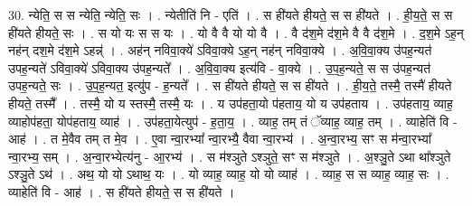 \documentclass[17pt]{extarticle}
\begin{document}
30. न्येति॒ स स न्येति॒ न्येति॒ सः । . न्येतीति॑ नि - एति॑ । . स ही॑यते हीयते॒ स स ही॑यते । . ही॒य॒ते॒ स स ही॑यते हीयते॒ सः । . स यो यः स स यः । . यो वै वै यो यो वै । . वै द॑श॒मे द॑श॒मे वै वै द॑श॒मे । . द॒श॒मे ऽह॒न् नह॑न् दश॒मे द॑श॒मे ऽहन्न्॑ । . अह॑न् नविवा॒क्ये॑ ऽविवा॒क्ये ऽह॒न् नह॑न् नविवा॒क्ये । . अ॒वि॒वा॒क्य उ॑पह॒न्यत॑ उपह॒न्यते॑ ऽविवा॒क्ये॑ ऽविवा॒क्य उ॑पह॒न्यते᳚ । . अ॒वि॒वा॒क्य इत्य॑वि - वा॒क्ये । . उ॒प॒ह॒न्यते॒ स स उ॑पह॒न्यत॑ उपह॒न्यते॒ सः । . उ॒प॒ह॒न्यत॒ इत्यु॑प - ह॒न्यते᳚ । . स ही॑यते हीयते॒ स स ही॑यते । . ही॒य॒ते॒ तस्मै॒ तस्मै॑ हीयते हीयते॒ तस्मै᳚ । . तस्मै॒ यो य स्तस्मै॒ तस्मै॒ यः । . य उप॑हता॒यो प॑हताय॒ यो य उप॑हताय । . उप॑हताय॒ व्याह॒ व्याहोप॑हता॒ योप॑हताय॒ व्याह॑ । . उप॑हता॒येत्युप॑ - ह॒ता॒य॒ । . व्याह॒ तम् तं ॅव्याह॒ व्याह॒ तम् । . व्याहेति॑ वि - आह॑ । . त मे॒वैव तम् त मे॒व । . ए॒वा न्वा॒रभ्या᳚ न्वा॒रभ्यै॒ वैवा न्वा॒रभ्य॑ । . अ॒न्वा॒रभ्य॒ सꣳ स म॑न्वा॒रभ्या᳚ न्वा॒रभ्य॒ सम् । . अ॒न्वा॒रभ्येत्य॑नु - आ॒रभ्य॑ । . स म॑श्ञुते ऽश्ञुते॒ सꣳ स म॑श्ञुते । . अ॒श्ञु॒ते ऽथा था᳚श्ञुते ऽश्ञु॒ते ऽथ॑ । . अथ॒ यो यो ऽथाथ॒ यः । . यो व्याह॒ व्याह॒ यो यो व्याह॑ । . व्याह॒ स स व्याह॒ व्याह॒ सः । . व्याहेति॑ वि - आह॑ । . स ही॑यते हीयते॒ स स ही॑यते । \newline
\end{document}
